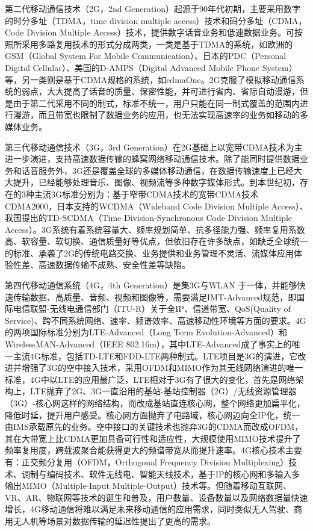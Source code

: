 \documentclass[figurelist,tablelist,algorithmlist,nomlist,masters]{seuthesix}
\begin{document}
	
	第二代移动通信技术（2G，2nd Generation）起源于90年代初期，主要采用数字的时分多址（TDMA，time division multiple access）技术和码分多址（CDMA，Code Division Multiple Access）技术，提供数字话音业务和低速数据业务。可按照所采用多路复用技术的形式分成两类，一类是基于TDMA的系统，如欧洲的GSM（Global System For Mobile Communication）、日本的PDC（Personal Digital Cellular）、美国的D-AMPS（Digital Advanced Mobile Phone System）等，另一类则是基于CDMA规格的系统，如cdmaOne。2G克服了模拟移动通信系统的弱点，大大提高了话音的质量、保密性能，并可进行省内、省际自动漫游，但是由于第二代采用不同的制式，标准不统一，用户只能在同一制式覆盖的范围内进行漫游，而且带宽也限制了数据业务的应用，也无法实现高速率的业务如移动的多媒体业务。
	
	第三代移动通信技术（3G，3rd Generation）在2G基础上以宽带CDMA技术为主进一步演进，支持高速数据传输的蜂窝网络移动通信技术。除了能同时提供数据业务和话音服务外，3G还是覆盖全球的多媒体移动通信，在数据传输速度上已经大大提升，已经能够处理音乐、图像、视频流等多种数字媒体形式。到本世纪初，存在的3种主流3G标准分别为：基于窄带CDMA技术的宽带CDMA技术CDMA2000，日本支持的WCDMA（Wideband Code Division Multiple Access）、我国提出的TD-SCDMA（Time Division-Synchronous Code Division Multiple Access）。3G系统有着系统容量大、频率规划简单、抗多径能力强、频率复用系数高、软容量、软切换、通信质量好等优点，但依旧存在许多缺点，如缺乏全球统一的标准、承袭了2G的传统电路交换、业务提供和业务管理不灵活、流媒体应用体验性差、高速数据传输不成熟、安全性差等缺陷。
	
	第四代移动通信系统（4G，4th Generation）是集3G与WLAN 于一体，并能够快速传输数据、高质量、音频、视频和图像等，需要满足IMT-Advanced规范，即国际电信联盟-无线电通信部门（ITU-R）关于全IP、信道带宽、QoS(Quality of Service)、跨不同系统网络、速率、频谱效率、高速移动性环境等方面的要求。4G的两项国际标准分别为LTE-Advanced（Long Term Evolution-Advanced）和WirelessMAN-Advanced（IEEE 802.16m），其中LTE-Advanced成了事实上的唯一主流4G标准，包括TD-LTE和FDD-LTE两种制式。LTE项目是3G的演进，它改进并增强了3G的空中接入技术，采用OFDM和MIMO作为其无线网络演进的唯一标准，4G中以LTE的应用最广泛，LTE相对于3G有了很大的变化，首先是网络架构上，LTE抛弃了2G、3G一直沿用的基站-基站控制器（2G）/无线资源管理器（3G）-核心网这样的网络结构，而改成基站直连核心网，整个网络更加扁平化，降低时延，提升用户感受。核心网方面抛弃了电路域，核心网迈向全IP化，统一由IMS承载原先的业务。空中接口的关键技术也抛弃3G的CDMA而改成OFDM，其在大带宽上比CDMA更加具备可行性和适应性，大规模使用MIMO技术提升了频率复用度，跨载波聚合能获得更大的频谱带宽从而提升速率。4G核心技术主要有：正交频分复用（OFDM，Orthogonal Frequency Division Multiplexing）技术、调制与编码技术、软件无线电、智能天线技术，基于IP的核心网和多输入多输出MIMO（Multiple-Input Multiple-Output）技术等。但随着移动互联网、VR、AR、物联网等技术的诞生和普及，用户数量、设备数量以及网络数据量快速增长，4G移动通信将难以满足未来移动通信的应用需求，同时类似无人驾驶、商用无人机等场景对数据传输的延迟性提出了更高的需求。
	
\end{document}
